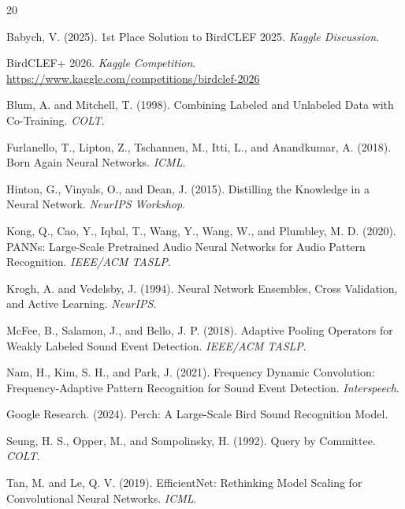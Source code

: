 \documentclass[a4paper]{article}
\begin{document}
\begin{thebibliography}{20}

Babych, V. (2025).
1st Place Solution to BirdCLEF 2025.
\textit{Kaggle Discussion}.

BirdCLEF+ 2026.
\textit{Kaggle Competition}.
\url{https://www.kaggle.com/competitions/birdclef-2026}

Blum, A. and Mitchell, T. (1998).
Combining Labeled and Unlabeled Data with Co-Training.
\textit{COLT}.

Furlanello, T., Lipton, Z., Tschannen, M., Itti, L., and Anandkumar, A. (2018).
Born Again Neural Networks.
\textit{ICML}.

Hinton, G., Vinyals, O., and Dean, J. (2015).
Distilling the Knowledge in a Neural Network.
\textit{NeurIPS Workshop}.

Kong, Q., Cao, Y., Iqbal, T., Wang, Y., Wang, W., and Plumbley, M. D. (2020).
PANNs: Large-Scale Pretrained Audio Neural Networks for Audio Pattern Recognition.
\textit{IEEE/ACM TASLP}.

Krogh, A. and Vedelsby, J. (1994).
Neural Network Ensembles, Cross Validation, and Active Learning.
\textit{NeurIPS}.

McFee, B., Salamon, J., and Bello, J. P. (2018).
Adaptive Pooling Operators for Weakly Labeled Sound Event Detection.
\textit{IEEE/ACM TASLP}.

Nam, H., Kim, S. H., and Park, J. (2021).
Frequency Dynamic Convolution: Frequency-Adaptive Pattern Recognition for Sound Event Detection.
\textit{Interspeech}.

Google Research. (2024).
Perch: A Large-Scale Bird Sound Recognition Model.

Seung, H. S., Opper, M., and Sompolinsky, H. (1992).
Query by Committee.
\textit{COLT}.

Tan, M. and Le, Q. V. (2019).
EfficientNet: Rethinking Model Scaling for Convolutional Neural Networks.
\textit{ICML}.


\end{thebibliography}
\end{document}

